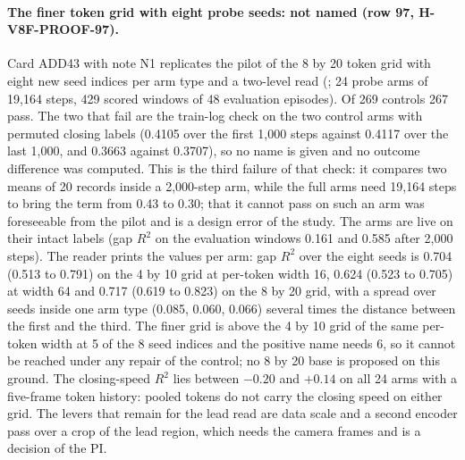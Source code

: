 \paragraph{The finer token grid with eight probe seeds: not named (row 97, H-V8F-PROOF-97).} Card ADD43 with note N1 replicates the pilot of the 8 by 20 token grid with eight new seed indices per arm type and a two-level read (; 24 probe arms of 19,164 steps, 429 scored windows of 48 evaluation episodes). Of 269 controls 267 pass. The two that fail are the train-log check on the two control arms with permuted closing labels (0.4105 over the first 1,000 steps against 0.4117 over the last 1,000, and 0.3663 against 0.3707), so no name is given and no outcome difference was computed. This is the third failure of that check: it compares two means of 20 records inside a 2,000-step arm, while the full arms need 19,164 steps to bring the term from 0.43 to 0.30; that it cannot pass on such an arm was foreseeable from the pilot and is a design error of the study. The arms are live on their intact labels (gap $R^2$ on the evaluation windows 0.161 and 0.585 after 2,000 steps). The reader prints the values per arm: gap $R^2$ over the eight seeds is 0.704 (0.513 to 0.791) on the 4 by 10 grid at per-token width 16, 0.624 (0.523 to 0.705) at width 64 and 0.717 (0.619 to 0.823) on the 8 by 20 grid, with a spread over seeds inside one arm type (0.085, 0.060, 0.066) several times the distance between the first and the third. The finer grid is above the 4 by 10 grid of the same per-token width at 5 of the 8 seed indices and the positive name needs 6, so it cannot be reached under any repair of the control; no 8 by 20 base is proposed on this ground. The closing-speed $R^2$ lies between $-0.20$ and $+0.14$ on all 24 arms with a five-frame token history: pooled tokens do not carry the closing speed on either grid. The levers that remain for the lead read are data scale and a second encoder pass over a crop of the lead region, which needs the camera frames and is a decision of the PI.
